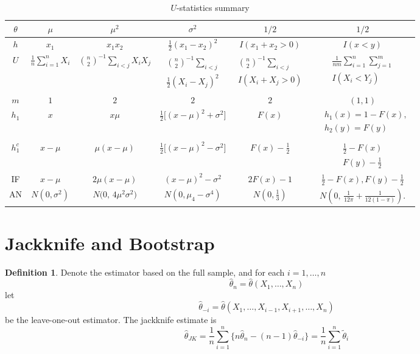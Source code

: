 \documentclass[11pt]{article}
\theoremstyle{definition}
\newtheorem{defn}{Definition}[section]
\begin{document}
\begin{table}[htbp]
\centering
\begin{tabular}{|c|c|c|c|c|c|}
\hline
$\theta$ & $\mu$ & $\mu^2$ & $\sigma^2$ & $1/2$ & $1/2$ \\ \hline
$h$  & $x_1$  & $x_1 x_2$  & $\frac{1}{2}(x_1 - x_2)^2$  &  $I(x_1 + x_2 > 0)$ & $I(x<y)$  \\ \hline
$U$  & $\frac{1}{n} \sum_{i=1}^n X_i$  & $\binom{n}{2}^{-1} \sum_{i<j} X_i X_j$  & $\begin{aligned}
    \binom{n}{2}^{-1} \sum_{i<j}\\ \frac{1}{2}(X_i - X_j)^2
\end{aligned}$ & $\begin{aligned}
    \binom{n}{2}^{-1} \sum_{ i<j}\\ I(X_i + X_j > 0)
\end{aligned}$ & $\begin{aligned}
    \frac{1}{nm} \sum_{i=1}^n \sum_{j=1}^m\\
    I(X_i < Y_j)
\end{aligned}$ \\ \hline
$m$ & $1$ & $2$ & $2$ & $2$ & $(1,1)$ \\ \hline
$h_1$ & $x$ & $x \mu$ & $\frac{1}{2}\big[(x-\mu)^2 + \sigma^2\big]$ & $F(x)$ & $\begin{aligned}
    &h_1(x) = 1 - F(x), \\
&h_2(y) = F(y) \\
\end{aligned}
$ \\ \hline
$h_1^c$ & $x - \mu$ & $\mu(x-\mu)$ & $\frac{1}{2}\big[(x-\mu)^2 - \sigma^2\big]$ & $F(x)-\frac{1}{2}$ & $\begin{aligned}
    \tfrac{1}{2} - F(x)\\
    F(y) - \tfrac{1}{2}
\end{aligned}$ \\ \hline
IF & $x - \mu$ & $2\mu(x-\mu)$ & $(x-\mu)^2 - \sigma^2$ & $2F(x) - 1$ & $\frac{1}{2}-F(x), F(y)-\frac{1}{2}$ \\ \hline
AN & $N(0, \sigma^2)$ & $N\big(0,\,4\mu^2\sigma^2\big)$ & $N(0,\mu_4-\sigma^4)$ & $N(0,\frac{1}{3})$ & $N\!\left(0,\,
\frac{1}{12\pi} + \frac{1}{12(1-\pi)}
\right).$ \\ \hline
\end{tabular}
\caption{$U$-statistics summary}
\end{table}
\newpage
\section{Jackknife and Bootstrap}
\begin{defn}
Denote the estimator based on the full sample, and for each \(i=1,\dots,n\)
    \[
\hat\theta_n=\hat\theta(X_1,\dots,X_n)
\]
let
\[
\hat\theta_{-i}
=
\hat\theta(X_1,\dots,X_{i-1},X_{i+1},\dots,X_n)
\]
be the leave-one-out estimator. The jackknife estimate is
\[
\hat\theta_{JK}
=\frac{1}{n}\sum_{i=1}^{n}
\{n\hat\theta_n-(n-1)\hat\theta_{-i}\} = \frac{1}{n}\sum_{i=1}^n\tilde \theta_i
\]
\end{defn}
\end{document}
